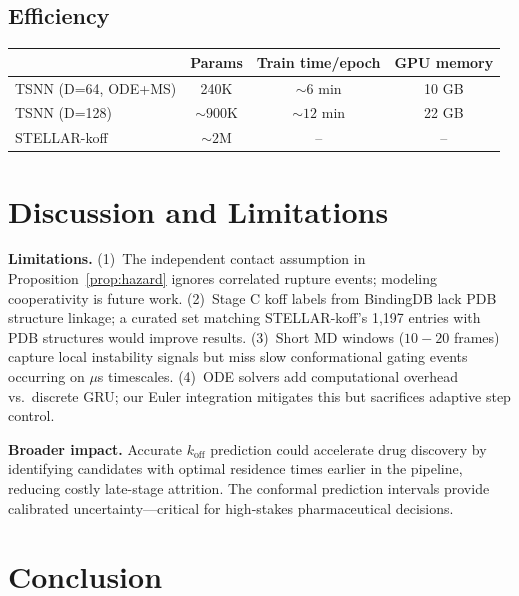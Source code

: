 \documentclass{article}
\begin{document}
\subsection{Efficiency}

\begin{table}[h]
\centering
\footnotesize
\begin{tabular}{@{}lccc@{}}
\toprule
& Params & Train time/epoch & GPU memory \\
\midrule
TSNN (D=64, ODE+MS) & 240K & ${\sim}6$ min & 10 GB \\
TSNN (D=128) & ${\sim}900$K & ${\sim}12$ min & 22 GB \\
STELLAR-koff & ${\sim}2$M & -- & -- \\
\bottomrule
\end{tabular}
\end{table}

\section{Discussion and Limitations}
\label{sec:discussion}

\textbf{Limitations.}
(1)~The independent contact assumption in Proposition~\ref{prop:hazard}
ignores correlated rupture events; modeling cooperativity is future
work.
(2)~Stage C koff labels from BindingDB lack PDB structure linkage;
a curated set matching STELLAR-koff's 1{,}197 entries with PDB
structures would improve results.
(3)~Short MD windows ($10{-}20$ frames) capture local instability
signals but miss slow conformational gating events occurring on
$\mu$s timescales.
(4)~ODE solvers add computational overhead vs.\ discrete GRU; our
Euler integration mitigates this but sacrifices adaptive step control.

\textbf{Broader impact.}
Accurate $k_\text{off}$ prediction could accelerate drug discovery
by identifying candidates with optimal residence times earlier in
the pipeline, reducing costly late-stage attrition.  The conformal
prediction intervals provide calibrated uncertainty---critical for
high-stakes pharmaceutical decisions.

\section{Conclusion}
\label{sec:conclusion}
\end{document}
